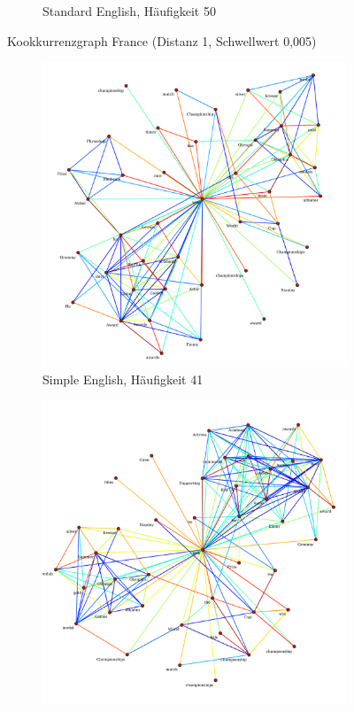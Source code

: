 \documentclass[11pt, a4paper]{article}
\begin{document}
\begin{figure}[hp!]
\begin{subfigure}[b]{0.5\textwidth}
        \caption{Standard English, Häufigkeit 50}
    \end{subfigure}
    \caption{Kookkurrenzgraph France (Distanz 1, Schwellwert 0,005)}
    \label{fig:hw-france}
\end{figure}

\begin{figure}[hp!]
    \centering
    \begin{subfigure}[b]{0.5\textwidth}
        \includegraphics[scale=.25]{../../data/results/cooc_wiki_sim/topwords-t0005/graph_won.pdf}
        \caption{Simple English, Häufigkeit 41}
    \end{subfigure}
    \begin{subfigure}[b]{0.5\textwidth}
        \includegraphics[scale=.25]{../../data/results/cooc_wiki_en/topwords-t0005/graph_won.pdf}

\end{subfigure}
\end{figure}
\end{document}
